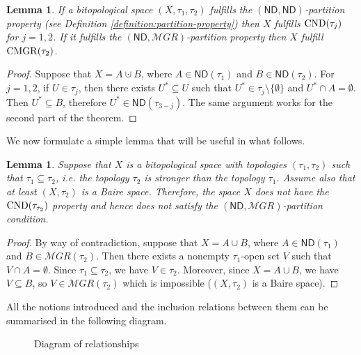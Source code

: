 \documentclass[12pt]{amsart}
\theoremstyle{plain}
\newtheorem{lemma}[theorem]{Lemma}
\theoremstyle{definition}
\theoremstyle{remark}
\newcommand{\meager}{{\mathcal MGR}}
\newcommand{\ND}{\mathsf{ND}}
\newcommand{\PiqueProperty}[2]{\mathrm{C%
\ifcase#1
ND%
\or MGR%
\else ND%
\fi
}(\tau_{#2})}
\begin{document}
\begin{lemma}
If a bitopological space $(X, \tau_1, \tau_2)$ fulfills the
$(\ND, \ND)$-partition property (see Definition \ref{definition:partition-property})
then $X$ fulfills $\PiqueProperty{0}{j}$ for $j = 1,2$.
If it fulfills the $(\ND, \meager)$-partition property
then $X$ fulfill $\PiqueProperty{1}{2}$.
\end{lemma}
\begin{proof}
  Suppose that $X = A \cupdot B$, where $A \in \ND(\tau_1)$
and $B \in \ND(\tau_2)$. For $j = 1,2$, if $U \in \tau_j$,
then there exists $U^* \subseteq U$ such that
$U^* \in \tau_j \setminus \lbrace \emptyset \rbrace$
and $U^* \cap A = \emptyset$. Then $U^* \subseteq B$,
therefore $U^* \in \ND(\tau_{3 - j})$. The same argument
works for the second part of the theorem.
\end{proof}

We now formulate a simple lemma that will be useful in what follows.
\begin{lemma}\label{lemma:no-nd-meager-partition}
  Suppose that $X$ is a bitopological space with topologies
$(\tau_1, \tau_2)$ such that $\tau_1 \subseteq \tau_2$, i.e.
the topology $\tau_2$ is stronger than the topology $\tau_1$.
Assume also that at least $(X, \tau_2)$ is a Baire
space. Therefore, the space $X$ does not have the $\PiqueProperty{2}{\tau_2}$
property and hence does not satisfy the $(\ND, \meager)$-partition condition.
\end{lemma}
\begin{proof}
  By way of contradiction, suppose that $X = A \cup B$, where
  $A \in \ND(\tau_1)$ and $B \in \meager(\tau_2)$.
  Then there exists a nonempty $\tau_1$-open set $V$
  such that $V \cap A = \emptyset$. Since $\tau_1\subseteq\tau_2$,
  we have $V \in \tau_2$. Moreover, since $X = A \cup B$,
  we have $V \subseteq B$, so $V \in \meager(\tau_2)$ which
  is impossible ($(X, \tau_2)$ is a Baire space).
\end{proof}

All the notions introduced and the inclusion relations between them
can be summarised in the following diagram.

\begin{figure}[h]
\centering
\caption{Diagram of relationships}
\label{figure:diagram-1}
\end{figure}
\end{document}
